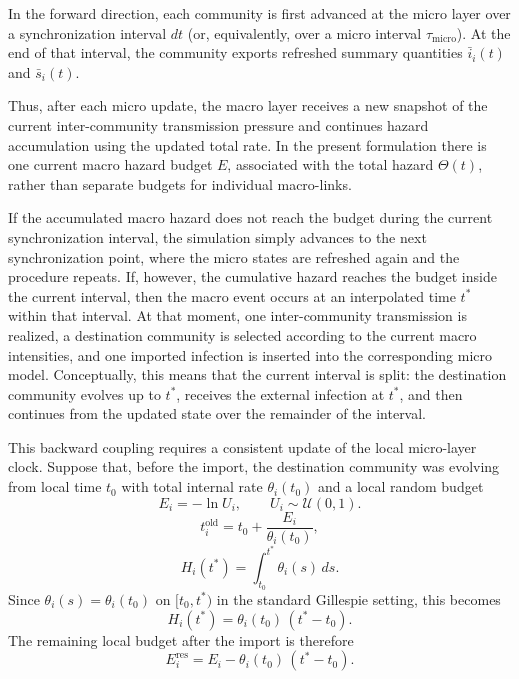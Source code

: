 \documentclass[12pt,a4paper]{article}
\begin{document}
In the forward direction, each community is first advanced at the micro layer over a synchronization interval \(dt\) (or, equivalently, over a micro interval \(\tau_{\mathrm{micro}}\)). At the end of that interval, the community exports refreshed summary quantities \(\bar{i}_i(t)\) and \(\bar{s}_i(t)\).

Thus, after each micro update, the macro layer receives a new snapshot of the current inter-community transmission pressure and continues hazard accumulation using the updated total rate. In the present formulation there is one current macro hazard budget \(E\), associated with the total hazard \(\Theta(t)\), rather than separate budgets for individual macro-links.

If the accumulated macro hazard does not reach the budget during the current synchronization interval, the simulation simply advances to the next synchronization point, where the micro states are refreshed again and the procedure repeats. If, however, the cumulative hazard reaches the budget inside the current interval, then the macro event occurs at an interpolated time \(t^\ast\) within that interval. At that moment, one inter-community transmission is realized, a destination community is selected according to the current macro intensities, and one imported infection is inserted into the corresponding micro model. Conceptually, this means that the current interval is split: the destination community evolves up to \(t^\ast\), receives the external infection at \(t^\ast\), and then continues from the updated state over the remainder of the interval.

This backward coupling requires a consistent update of the local micro-layer clock. Suppose that, before the import, the destination community was evolving from local time \(t_0\) with total internal rate \(\theta_i(t_0)\) and a local random budget
\[
E_i=-\ln U_i, \qquad U_i\sim \mathcal U(0,1).
\]
\[
t_i^{\mathrm{old}}=t_0+\frac{E_i}{\theta_i(t_0)},
\]
\[
H_i(t^\ast)=\int_{t_0}^{t^\ast}\theta_i(s)\,ds.
\]
Since \(\theta_i(s)=\theta_i(t_0)\) on \([t_0,t^\ast)\) in the standard Gillespie setting, this becomes
\[
H_i(t^\ast)=\theta_i(t_0)\,(t^\ast-t_0).
\]
The remaining local budget after the import is therefore
\[
E_i^{\mathrm{res}}=E_i-\theta_i(t_0)\,(t^\ast-t_0).
\]
\end{document}
